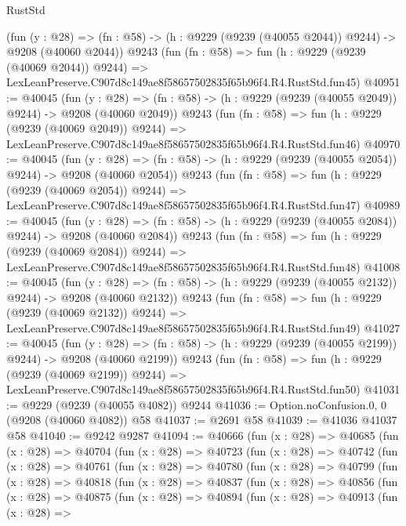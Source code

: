 \begin{lexlean}{RustStd}
\begin{coremodule}
    (fun (y : @28) =>
    (fn : @58) -> (h : @9229 (@9239 (@40055 @2044)) @9244) -> @9208 (@40060 @2044))
    @9243
    (fun (fn : @58) =>
    fun (h : @9229 (@9239 (@40069 @2044)) @9244) =>
    LexLeanPreserve.C907d8c149ae8f58657502835f65b96f4.R4.RustStd.fun45)
@40951 := @40045
    (fun (y : @28) =>
    (fn : @58) -> (h : @9229 (@9239 (@40055 @2049)) @9244) -> @9208 (@40060 @2049))
    @9243
    (fun (fn : @58) =>
    fun (h : @9229 (@9239 (@40069 @2049)) @9244) =>
    LexLeanPreserve.C907d8c149ae8f58657502835f65b96f4.R4.RustStd.fun46)
@40970 := @40045
    (fun (y : @28) =>
    (fn : @58) -> (h : @9229 (@9239 (@40055 @2054)) @9244) -> @9208 (@40060 @2054))
    @9243
    (fun (fn : @58) =>
    fun (h : @9229 (@9239 (@40069 @2054)) @9244) =>
    LexLeanPreserve.C907d8c149ae8f58657502835f65b96f4.R4.RustStd.fun47)
@40989 := @40045
    (fun (y : @28) =>
    (fn : @58) -> (h : @9229 (@9239 (@40055 @2084)) @9244) -> @9208 (@40060 @2084))
    @9243
    (fun (fn : @58) =>
    fun (h : @9229 (@9239 (@40069 @2084)) @9244) =>
    LexLeanPreserve.C907d8c149ae8f58657502835f65b96f4.R4.RustStd.fun48)
@41008 := @40045
    (fun (y : @28) =>
    (fn : @58) -> (h : @9229 (@9239 (@40055 @2132)) @9244) -> @9208 (@40060 @2132))
    @9243
    (fun (fn : @58) =>
    fun (h : @9229 (@9239 (@40069 @2132)) @9244) =>
    LexLeanPreserve.C907d8c149ae8f58657502835f65b96f4.R4.RustStd.fun49)
@41027 := @40045
    (fun (y : @28) =>
    (fn : @58) -> (h : @9229 (@9239 (@40055 @2199)) @9244) -> @9208 (@40060 @2199))
    @9243
    (fun (fn : @58) =>
    fun (h : @9229 (@9239 (@40069 @2199)) @9244) =>
    LexLeanPreserve.C907d8c149ae8f58657502835f65b96f4.R4.RustStd.fun50)
@41031 := @9229 (@9239 (@40055 @4082)) @9244
@41036 := Option.noConfusion.{0, 0} (@9208 (@40060 @4082)) @58
@41037 := @2691 @58
@41039 := @41036 @41037 @58
@41040 := @9242 @9287
@41094 := @40666
    (fun (x : @28) =>
    @40685
      (fun (x : @28) =>
      @40704
        (fun (x : @28) =>
        @40723
          (fun (x : @28) =>
          @40742
            (fun (x : @28) =>
            @40761
              (fun (x : @28) =>
              @40780
                (fun (x : @28) =>
                @40799
                  (fun (x : @28) =>
                  @40818
                    (fun (x : @28) =>
                    @40837
                      (fun (x : @28) =>
                      @40856
                        (fun (x : @28) =>
                        @40875
                          (fun (x : @28) =>
                          @40894
                            (fun (x : @28) =>
                            @40913
                              (fun (x : @28) =>

\end{coremodule}
\end{lexlean}
